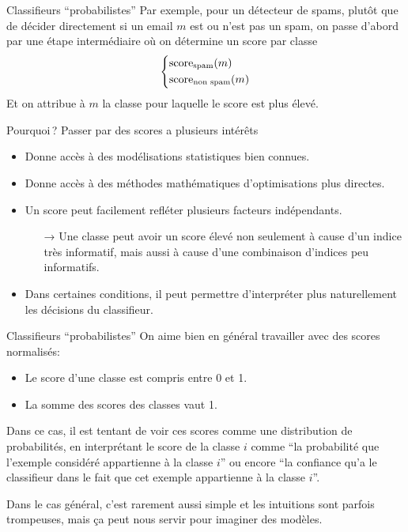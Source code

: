 \documentclass[../allslides.tex]{subfiles}
\begin{document}
\begin{frame}{Classifieurs \enquote{probabilistes}}
	Par exemple, pour un détecteur de spams, plutôt que de décider directement si un email \(m\) est ou n'est pas un spam, on passe d'abord par une étape intermédiaire où on détermine un score par classe
	\begin{equation}
		\begin{dcases*}
			\text{score}_{\text{spam}}(m)\\
			\text{score}_{\text{non spam}}(m)
		\end{dcases*}
	\end{equation}
	Et on attribue à \(m\) la classe pour laquelle le score est plus élevé.
\end{frame}

\begin{frame}{Pourquoi ?}
	Passer par des scores a plusieurs intérêts

	\begin{itemize}
		\item Donne accès à des \alert{modélisations statistiques} bien connues.
		\item Donne accès à des \alert{méthodes mathématiques} d'optimisations plus directes.
		\item Un score peut facilement refléter plusieurs \alert{facteurs indépendants}.
			\begin{itemize}
				\item[→] Une classe peut avoir un score élevé non seulement à cause d'un indice très informatif, mais aussi à cause d'une combinaison d'indices peu informatifs.
			\end{itemize}
		\item Dans certaines conditions, il peut permettre d'\alert{interpréter} plus naturellement les décisions du classifieur.
	\end{itemize}
\end{frame}

\begin{frame}{Classifieurs \enquote{probabilistes}}
	On aime bien en général travailler avec des scores \alert{normalisés}:

	\begin{itemize}
		\item Le score d'une classe est compris entre \num{0} et \num{1}.
		\item La somme des scores des classes vaut \num{1}.
	\end{itemize}

	\pause

	Dans ce cas, il est tentant de voir ces scores comme une \alert{distribution de probabilités}, en interprétant le score de la classe \(i\) comme \enquote{la probabilité que l'exemple considéré appartienne à la classe \(i\)} ou encore \enquote{la \alert{confiance} qu'a le classifieur dans le fait que cet exemple appartienne à la classe \(i\)}.

	Dans le cas général, c'est rarement aussi simple et les intuitions sont parfois trompeuses, mais ça peut nous servir pour imaginer des modèles.
\end{frame}
\end{document}
